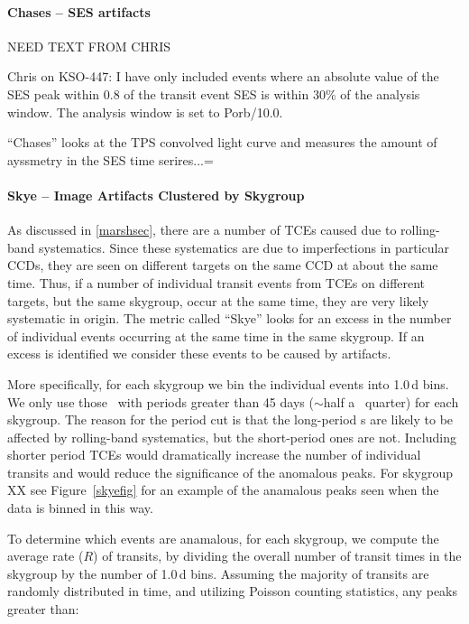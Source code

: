\paragraph{Chases -- SES artifacts}

NEED TEXT FROM CHRIS

Chris on KSO-447: I have only included events where an absolute value of the SES peak within 0.8 of the transit event SES is within 30\% of the analysis window. The analysis window is set to Porb/10.0.

``Chases'' looks at the TPS convolved light curve and measures the amount of ayssmetry in the SES time serires...=



\paragraph{Skye -- Image Artifacts Clustered by Skygroup}


As discussed in \ref{marshsec}, there are a number of TCEs caused due to rolling-band systematics. Since these systematics are due to imperfections in particular CCDs, they are seen on different targets on the same CCD at about the same time. Thus, if a number of individual transit events from TCEs on different targets, but the same skygroup, occur at the same time, they are very likely systematic in origin. The metric called ``Skye'' looks for an excess in the number of individual events occurring at the same time in the same skygroup. If an excess is identified we consider these events to be caused by artifacts. 


More specifically, for each skygroup we bin the individual events into 1.0\,d bins. We only use those \opstce\ with periods greater than 45 days ($\sim$half a \Kepler\ quarter) for each skygroup. The reason for the period cut is that the long-period \opstce s are likely to be affected by rolling-band systematics, but the short-period ones are not.  Including shorter period TCEs would dramatically increase the number of individual transits and would reduce the significance of the anomalous peaks. For skygroup XX see Figure~\ref{skyefig} for an example of the anamalous peaks seen when the data is binned in this way.

To determine which events are anamalous, for each skygroup, we compute the average rate ($R$) of transits, by dividing the overall number of transit times in the skygroup by the number of 1.0\,d bins. Assuming the majority of transits are randomly distributed in time, and utilizing Poisson counting statistics, any peaks greater than:

